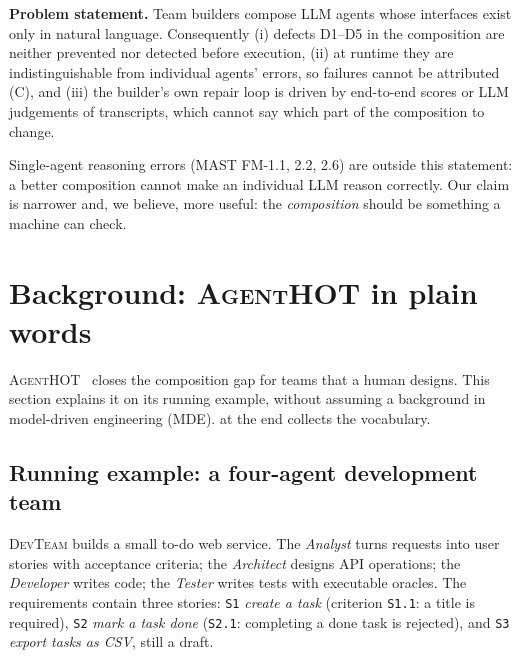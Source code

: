 \documentclass[10pt,a4paper]{article}
\newcommand{\tool}{\textsc{AgentHOT}}
\newcommand{\D}[1]{\textsf{D#1}}
\newcommand{\devteam}{\textsc{DevTeam}}
\newcommand{\code}[1]{\texttt{#1}}
\begin{document}
\begin{tcolorbox}[enhanced, colback=accentlight, colframe=accentlight, arc=0pt,
   boxrule=0pt, borderline west={2.2pt}{0pt}{accent}, left=10pt, right=10pt,
   top=6pt, bottom=6pt]
{\sffamily\bfseries\color{accent}Problem statement.}\enspace
Team builders compose LLM agents whose interfaces exist only in natural
language. Consequently (i) defects \D{1}--\D{5} in the composition are
neither prevented nor detected before execution, (ii) at runtime they are
indistinguishable from individual agents' errors, so failures cannot be
attributed (C), and (iii) the builder's own repair loop is driven by
end-to-end scores or LLM judgements of transcripts, which cannot say which
part of the composition to change.
\end{tcolorbox}

Single-agent reasoning errors (MAST FM-1.1, 2.2, 2.6) are outside this
statement: a better composition cannot make an individual LLM reason
correctly. Our claim is narrower and, we believe, more useful: the
\emph{composition} should be something a machine can check.
\section{Background: \tool{} in plain words}\label{sec:background}

\tool{}~\cite{agenthot2026} closes the composition gap for teams that a
human designs. This section explains it on its running example, without
assuming a background in model-driven engineering (MDE). 
at the end collects the vocabulary.

\subsection{Running example: a four-agent development team}

\devteam{} builds a small to-do web service. The \emph{Analyst} turns
requests into user stories with acceptance criteria; the \emph{Architect}
designs API operations; the \emph{Developer} writes code; the \emph{Tester}
writes tests with executable oracles. The requirements contain three
stories: \code{S1} \emph{create a task} (criterion \code{S1.1}: a title is
required), \code{S2} \emph{mark a task done} (\code{S2.1}: completing a
done task is rejected), and \code{S3} \emph{export tasks as CSV}, still a
draft.
\end{document}
